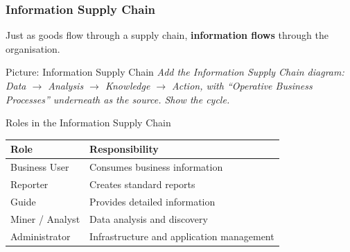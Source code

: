 \begin{frame}
  \frametitle{Information Supply Chain}

  Just as goods flow through a supply chain, \textbf{information flows} through
  the organisation.

  \begin{alertblock}{Picture: Information Supply Chain}
    \textit{Add the Information Supply Chain diagram:
    Data $\to$ Analysis $\to$ Knowledge $\to$ Action, with ``Operative Business
    Processes'' underneath as the source. Show the cycle.}
  \end{alertblock}

  \begin{block}{Roles in the Information Supply Chain}
    \begin{tabularx}{\linewidth}{@{}l X@{}}
      \toprule
      \textbf{Role}          & \textbf{Responsibility} \\
      \midrule
      Business User          & Consumes business information \\
      Reporter               & Creates standard reports \\
      Guide                  & Provides detailed information \\
      Miner / Analyst        & Data analysis and discovery \\
      Administrator          & Infrastructure and application management \\
      \bottomrule
    \end{tabularx}
  \end{block}
\end{frame}


